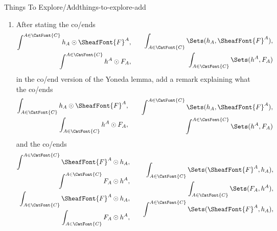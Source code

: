 \begin{remark}{Things To Explore/Add}{things-to-explore-add}
\begin{enumerate}
\begin{enumerate}
            \end{enumerate}
        \item After stating the co/ends
            \[
                \begin{aligned}
                    \int^{A\in\CatFont{C}}h_{A}\odot\SheafFont{F}^{A},\\
                    \int^{A\in\CatFont{C}}h^{A}\odot F_{A},
                \end{aligned}
                \qquad
                \begin{aligned}
                    \int_{A\in\CatFont{C}}\Sets(h_{A},\SheafFont{F}^{A}),\\
                    \int_{A\in\CatFont{C}}\Sets(h^{A},F_{A})
                \end{aligned}
            \]%
            in the co/end version of the Yoneda lemma, add a remark explaining what the co/ends
            \[
                \begin{aligned}
                    \int_{A\in\CatFont{C}}h_{A}\odot\SheafFont{F}^{A},\\
                    \int_{A\in\CatFont{C}}h^{A}\odot F_{A},
                \end{aligned}
                \qquad
                \begin{aligned}
                    \int^{A\in\CatFont{C}}\Sets(h_{A},\SheafFont{F}^{A}),\\
                    \int^{A\in\CatFont{C}}\Sets(h^{A},F_{A})
                \end{aligned}
            \]%
            and the co/ends
            \[
                \begin{aligned}
                    \int^{A\in\CatFont{C}}\SheafFont{F}^{A}\odot h_{A},\\
                    \int^{A\in\CatFont{C}}F_{A}\odot h^{A},\\
                    \int_{A\in\CatFont{C}}\SheafFont{F}^{A}\odot h_{A},\\
                    \int_{A\in\CatFont{C}}F_{A}\odot h^{A},\\
                \end{aligned}
                \qquad
                \begin{aligned}
                    \int_{A\in\CatFont{C}}\Sets(\SheafFont{F}^{A},h_{A}),\\
                    \int_{A\in\CatFont{C}}\Sets(F_{A},h^{A}),\\
                    \int^{A\in\CatFont{C}}\Sets(\SheafFont{F}^{A},h_{A}),\\

\end{aligned}\]
\end{enumerate}
\end{remark}
